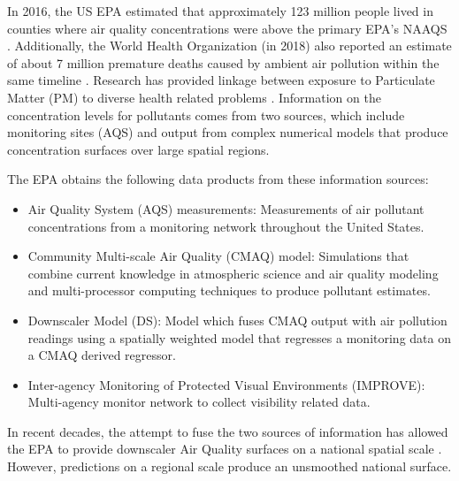 \documentclass[10pt]{article}
\begin{document}
In 2016, the US EPA estimated that approximately 123 million people lived in 
counties where air quality concentrations were above the primary EPA's NAAQS \cite{EPAAir}. Additionally, the World Health Organization (in 2018) also reported an estimate of about 7 million premature deaths caused by ambient air pollution within the same timeline \cite{WhoAir}.
Research has provided linkage between exposure to Particulate Matter (PM) to diverse health related problems \cite{schwartz1996air, braga2001lag, dominici2006fine}. Information on the concentration levels for pollutants comes from two sources, which include monitoring sites (AQS) and output from complex numerical models that produce concentration surfaces over large spatial regions.\\
\vspace{-1em}
\begin{flushleft}
The EPA obtains the following data products from these information sources:
\begin{itemize}
	\vspace{-0.5em}
	\item Air Quality System (AQS) measurements: Measurements of air pollutant concentrations from a monitoring network throughout the United States.
	\vspace{-0.5em}
	\item Community Multi-scale Air Quality (CMAQ) model: Simulations that combine current knowledge in atmospheric science and air quality modeling and multi-processor computing techniques to produce pollutant estimates.
	\vspace{-0.5em}
	\item Downscaler Model (DS): Model which fuses CMAQ output with air pollution readings using a spatially weighted model that regresses a monitoring data on a CMAQ derived regressor.
	\vspace{-0.5em}
	\item Inter-agency Monitoring of Protected Visual Environments (IMPROVE): Multi-agency monitor network to collect visibility related data.
\end{itemize}

\end{flushleft}
\begin{flushleft}
In recent decades, the attempt to fuse the two sources of information has allowed the EPA to provide downscaler Air Quality surfaces on a national spatial scale \cite{berrocal2010bivariate, berrocal2010spatio}. However, predictions on a regional scale produce an unsmoothed national surface.\\~
\end{flushleft}
\end{document}
